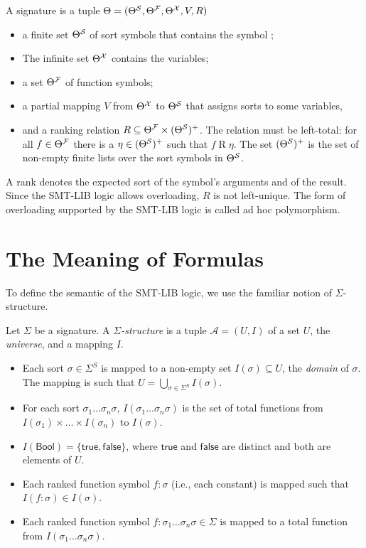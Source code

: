 \begin{definition}[Signature]
A signature is a tuple $\Theta = (\Theta^\cal{S}, \Theta^\cal{F}, \Theta^\cal{X}, V, R)$
\begin{itemize}
    \item  a finite set $\Theta^\cal{S}$  of sort symbols that contains the symbol ;
    \item The infinite set $\Theta^\cal{X}$ contains the variables;
    \item a set $\Theta^\cal{F}$ of function symbols;
    \item a partial mapping $V$ from $\Theta^\cal{X}$ to $\Theta^\cal{S}$ that assigns sorts to some variables,
    \item and a ranking relation $R \subseteq \Theta^\cal{F} \times (\Theta^\cal{S})^+$. The relation must be left-total: for
    all $f \in \Theta^\cal{F}$ there is a $\eta \in (\Theta^\cal{S})^+$ such that $f \mathrel{R} \eta$. The set $(\Theta^\cal{S})^+$ 
    is the set of non-empty finite lists over the sort symbols in $\Theta^\cal{S}$.
\end{itemize}
\end{definition}


A rank denotes the expected sort of the symbol's arguments and of the result.
Since the SMT-LIB logic allows overloading, $R$ is not left-unique. The form of overloading supported by the SMT-LIB logic is called ad hoc polymorphism.

\section{The Meaning of Formulas}

To define the semantic of the SMT-LIB logic, we use the familiar notion of $\Sigma$-structure.

\begin{definition}
Let $\Sigma$ be a signature.  
A \emph{$\Sigma$-structure} is a tuple $\mathcal{A} = (U, I)$ of a set $U$, the \emph{universe}, and a mapping $I$.
\begin{itemize}
    \item Each sort $\sigma \in \Sigma^{S}$ is mapped to a non-empty set $I(\sigma) \subseteq U$, the \emph{domain} of $\sigma$.  
    The mapping is such that $U = \bigcup_{\sigma \in \Sigma^{S}} I(\sigma)$.
    \item For each sort $\sigma_1 \dots \sigma_n \sigma$, $I(\sigma_1 \dots \sigma_n \sigma)$ is the set of total functions from $I(\sigma_1) \times \dots \times I(\sigma_n)$ to $I(\sigma)$.
    \item $I(\mathsf{Bool}) = \{\mathsf{true}, \mathsf{false}\}$, where $\mathsf{true}$ and $\mathsf{false}$ are distinct and both are elements of $U$.
    \item Each ranked function symbol $f : \sigma$ (i.e., each constant) is mapped such that $I(f : \sigma) \in I(\sigma)$.
    \item Each ranked function symbol $f : \sigma_1 \dots \sigma_n \sigma \in \Sigma$ is mapped to a total function from $I(\sigma_1 \dots \sigma_n \sigma)$.
\end{itemize}
\end{definition}

